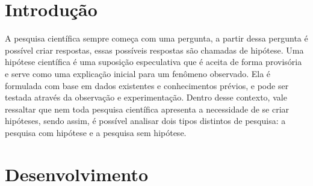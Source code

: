 \section{\esp Introdução}

A pesquisa científica sempre começa com uma pergunta, a partir dessa pergunta é possível criar respostas, essas possíveis respostas são chamadas de hipótese. Uma hipótese científica é uma suposição especulativa que é aceita de forma provisória e serve como uma explicação inicial para um fenômeno observado. Ela é formulada com base em dados existentes e conhecimentos prévios, e pode ser testada através da observação e experimentação. Dentro desse contexto, vale ressaltar que nem toda pesquisa científica apresenta a necessidade de se criar hipóteses, sendo assim, é possível analisar dois tipos distintos de pesquisa: a pesquisa com hipótese e a pesquisa sem hipótese.

\section{\esp Desenvolvimento}

